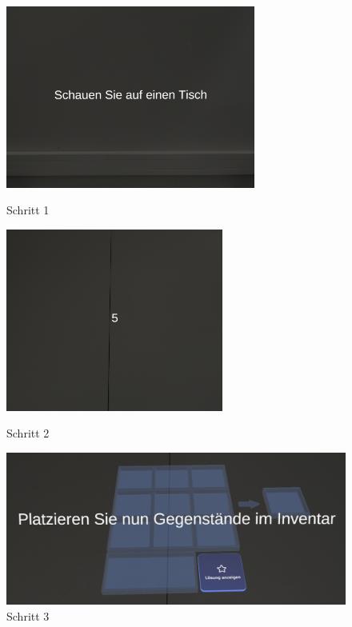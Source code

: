 \begin{figure}[H]
    \centering
    \begin{minipage}[b]{0.48\textwidth}
        \centering
        \includegraphics[width=\textwidth, height=6cm]{images/schritteins.png}
        \caption{Schritt 1}
        \label{fig:eins}
    \end{minipage}
    \hfill
    \begin{minipage}[b]{0.48\textwidth}
        \centering
        \includegraphics[width=\textwidth, height=6cm]{images/schrittzwei.png}
        \caption{Schritt 2}
        \label{fig:zwei}
    \end{minipage}

    \vspace{0.5cm} %

    \begin{minipage}[b]{1\textwidth}
        \centering
        \includegraphics[width=1\textwidth]{images/schrittdrei.png}
        \caption{Schritt 3}
        \label{fig:drei}
    \end{minipage}
\end{figure}


